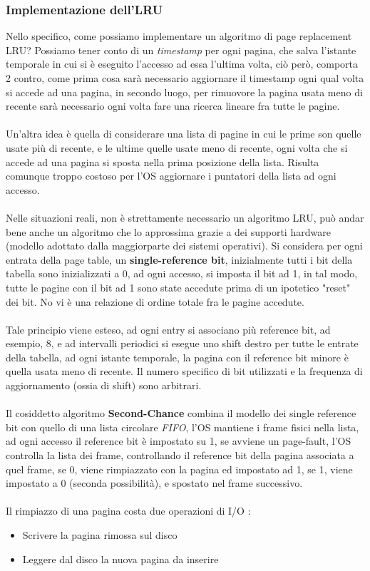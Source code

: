 \documentclass[12pt, letterpaper]{article}
\newcommand{\acc}{\\\hphantom{}\\}
\begin{document}
\subsubsection{Implementazione dell'LRU}
Nello specifico, come possiamo implementare un algoritmo di page replacement LRU? Possiamo tener conto di un 
\textit{timestamp} per ogni pagina, che salva l'istante temporale in cui si è eseguito l'accesso ad essa l'ultima 
volta, ciò però, comporta 2 contro, come prima cosa sarà necessario aggiornare il timestamp ogni qual volta si accede 
ad una pagina, in secondo luogo, per rimuovore la pagina usata meno di recente sarà necessario ogni volta fare 
una ricerca lineare fra tutte le pagine.\acc Un'altra idea è quella di considerare una lista di pagine in cui le prime 
son quelle usate più di recente, e le ultime quelle usate meno di recente, ogni volta che si accede ad una pagina si sposta 
nella prima posizione della lista. Risulta comunque troppo costoso per l'OS aggiornare i puntatori della lista ad ogni 
accesso.\acc 
Nelle situazioni reali, non è strettamente necessario un algoritmo LRU, può andar bene anche un algoritmo che lo 
approssima grazie a dei supporti hardware (modello adottato dalla maggiorparte dei sistemi operativi). Si considera 
per ogni entrata della page table, un \textbf{single-reference bit}, inizialmente tutti i bit della tabella sono 
inizializzati a 0, ad ogni accesso, si imposta il bit ad 1, in tal modo, tutte le pagine con il bit ad 1 sono state accedute 
prima di un ipotetico "reset" dei bit. No vi è una relazione di ordine totale fra le pagine accedute. \acc 
Tale principio viene esteso, ad ogni entry si associano più reference bit, ad esempio, 8, e ad intervalli periodici 
si esegue uno shift destro per tutte le entrate della tabella, ad ogni istante temporale, la pagina con il 
reference bit minore è quella usata meno di recente. Il numero specifico di bit utilizzati e la frequenza di 
aggiornamento (ossia di shift) sono arbitrari.\acc 
Il cosiddetto algoritmo \textbf{Second-Chance} combina il modello dei single reference bit con quello di una 
lista circolare \textit{FIFO}, l'OS mantiene i frame fisici nella lista, ad ogni accesso il reference bit è 
impostato su 1, se avviene un page-fault, l'OS controlla la lista dei frame, controllando il reference bit della 
pagina associata a quel frame, se 0, viene rimpiazzato con la pagina ed impostato ad 1, se 1, viene impostato 
a 0 (seconda possibilità), e spostato nel frame successivo.\acc 
Il rimpiazzo di una pagina costa due operazioni di I/O : \begin{itemize}
    \item Scrivere la pagina rimossa sul disco 
    \item Leggere dal disco la nuova pagina da inserire 
\end{itemize}
\end{document}
